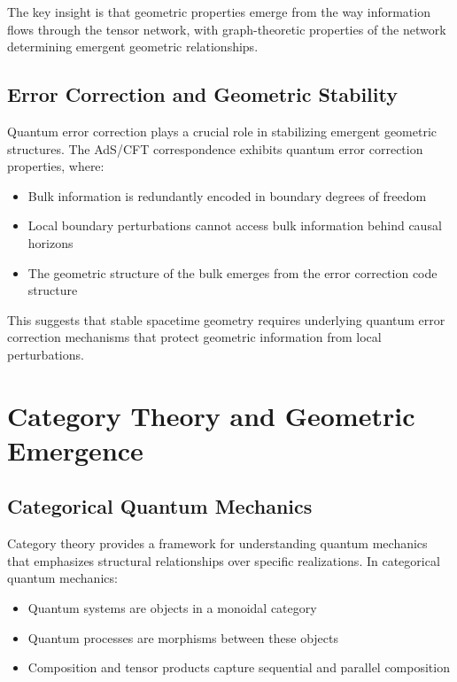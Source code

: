 \documentclass[12pt]{article}
\begin{document}
The key insight is that geometric properties emerge from the way information flows through the tensor network, with graph-theoretic properties of the network determining emergent geometric relationships.

\subsection{Error Correction and Geometric Stability}

Quantum error correction plays a crucial role in stabilizing emergent geometric structures. The AdS/CFT correspondence exhibits quantum error correction properties, where:

\begin{itemize}
\item Bulk information is redundantly encoded in boundary degrees of freedom
\item Local boundary perturbations cannot access bulk information behind causal horizons
\item The geometric structure of the bulk emerges from the error correction code structure
\end{itemize}

This suggests that stable spacetime geometry requires underlying quantum error correction mechanisms that protect geometric information from local perturbations.

\section{Category Theory and Geometric Emergence}

\subsection{Categorical Quantum Mechanics}

Category theory provides a framework for understanding quantum mechanics that emphasizes structural relationships over specific realizations. In categorical quantum mechanics:

\begin{itemize}
\item Quantum systems are objects in a monoidal category
\item Quantum processes are morphisms between these objects
\item Composition and tensor products capture sequential and parallel composition
\end{itemize}
\end{document}
